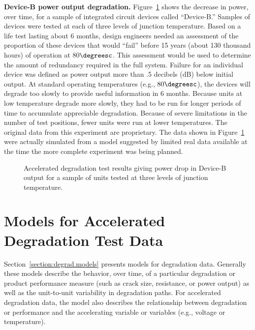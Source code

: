 \begin{example}
\label{example:device-b.degradation.data}
{\bf Device-B power output degradation.}
Figure~\ref{figure:device.b.degradation.data.ps} shows the decrease
in power, over time, for a sample of integrated circuit devices
called ``Device-B.''  Samples of devices were tested at each of
three levels of junction temperature. Based on a life test lasting about
6 months, design engineers needed an assessment of the proportion of
these devices that would ``fail'' before 15 years (about 130 thousand
hours) of operation at 80$\degreesc$. This assessment would be used
to determine the amount of redundancy required in the full system.
Failure for an individual device was defined as power output more
than .5 decibels (dB) below initial output. At standard operating
temperatures (e.g., $80 \degreesc$), the devices will degrade too
slowly to provide useful information in 6 months.  Because units at
low temperature degrade more slowly, they had to be run for longer
periods of time to accumulate appreciable degradation.  Because of
severe limitations in the number of test positions, fewer units were
run at lower temperatures. The original data from this experiment
are proprietary. The data shown in
Figure~\ref{figure:device.b.degradation.data.ps} were actually
simulated from a model suggested by limited real data available at
the time the more complete experiment was being planned.
\begin{figure}
\caption{Accelerated degradation test results
giving power drop in Device-B output for a sample of units tested at
three levels of junction temperature.}
\label{figure:device.b.degradation.data.ps}
\end{figure}
\end{example}

\section{Models for Accelerated Degradation Test Data}
\label{section:adt.models}
Section~\ref{section:degrad.models} presents models for degradation
data. Generally these models describe the behavior, over time, of a
particular degradation or product performance measure (such as crack
size, resistance, or power output) as well as 
the unit-to-unit variability in degradation paths. 
For accelerated degradation data, the model also describes the
relationship between degradation or performance and the accelerating
variable or variables (e.g., voltage or temperature).

